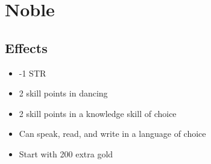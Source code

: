 \section{Noble}\label{background:noble}

\subsection{Effects}
\begin{itemize}
    \item -1 STR
    \item 2 skill points in dancing
    \item 2 skill points in a knowledge skill of choice
    \item Can speak, read, and write in a language of choice
    \item Start with 200 extra gold
\end{itemize}
